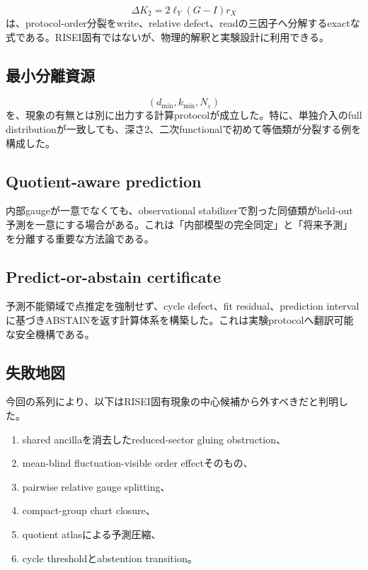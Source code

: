 \documentclass[11pt,a4paper,uplatex,dvipdfmx]{bxjsarticle}
\theoremstyle{remark}
\newcommand{\eps}{\varepsilon}
\begin{document}
\begin{equation}
\Delta K_2=2\ell_Y(G-I)r_X
\end{equation}
は、protocol-order分裂をwrite、relative defect、readの三因子へ分解するexactな式である。RISEI固有ではないが、物理的解釈と実験設計に利用できる。

\subsection{最小分離資源}

\begin{equation}
(d_{\min},k_{\min},N_{\eps})
\end{equation}
を、現象の有無とは別に出力する計算protocolが成立した。特に、単独介入のfull distributionが一致しても、深さ2、二次functionalで初めて等価類が分裂する例を構成した。

\subsection{Quotient-aware prediction}

内部gaugeが一意でなくても、observational stabilizerで割った同値類がheld-out予測を一意にする場合がある。これは「内部模型の完全同定」と「将来予測」を分離する重要な方法論である。

\subsection{Predict-or-abstain certificate}

予測不能領域で点推定を強制せず、cycle defect、fit residual、prediction intervalに基づきABSTAINを返す計算体系を構築した。これは実験protocolへ翻訳可能な安全機構である。

\subsection{失敗地図}

今回の系列により、以下はRISEI固有現象の中心候補から外すべきだと判明した。

\begin{enumerate}
  \item shared ancillaを消去したreduced-sector gluing obstruction、
  \item mean-blind fluctuation-visible order effectそのもの、
  \item pairwise relative gauge splitting、
  \item compact-group chart closure、
  \item quotient atlasによる予測圧縮、
  \item cycle thresholdとabstention transition。
\end{enumerate}
\end{document}
